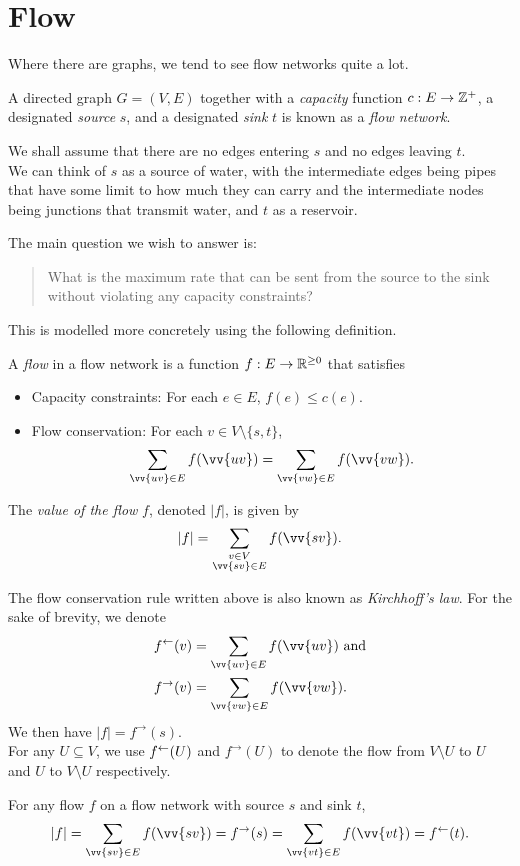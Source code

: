 \section{Flow}

Where there are graphs, we tend to see flow networks quite a lot.

\begin{fdef}
	A directed graph $G=(V,E)$ together with a \textit{capacity} function $c:E\to\mathbb{Z}^+$, a designated \textit{source} $s$, and a designated \textit{sink} $t$ is known as a \textit{flow network}.
\end{fdef}

We shall assume that there are no edges entering $s$ and no edges leaving $t$.\\
We can think of $s$ as a source of water, with the intermediate edges being pipes that have some limit to how much they can carry and the intermediate nodes being junctions that transmit water, and $t$ as a reservoir.

The main question we wish to answer is:
\begin{quote}
	What is the maximum rate that can be sent from the source to the sink without violating any capacity constraints?
\end{quote}

This is modelled more concretely using the following definition.

\begin{fdef}[Flow]
	A \textit{flow} in a flow network is a function $f:E\to\mathbb{R}^{\geq 0}$ that satisfies
	\begin{itemize}
		\item Capacity constraints: For each $e\in E$, $f(e)\leq c(e)$.
		\item Flow conservation: For each $v\in V\setminus\{s,t\}$,
		\[ \sum_{\vv{uv}\in E} f(\vv{uv}) = \sum_{\vv{vw}\in E} f(\vv{vw}). \]
	\end{itemize}
	The \textit{value of the flow} $f$, denoted $|f|$, is given by
	\[ |f| = \sum_{\substack{v\in V \\ \vv{sv}\in E}} f(\vv{sv}). \]
\end{fdef}

The flow conservation rule written above is also known as \textit{Kirchhoff's law}. For the sake of brevity, we denote
\begin{align*}
	f^{\ot}(v) &= \sum_{\vv{uv}\in E} f(\vv{uv}) \text{ and} \\
	f^{\to}(v) &= \sum_{\vv{vw}\in E} f(\vv{vw}).
\end{align*}
We then have $|f|=f^{\to}(s)$.\\
For any $U\subseteq V$, we use $f^{\leftarrow}(U)$ and $f^{\to}(U)$ to denote the flow from $V\setminus U$ to $U$ and $U$ to $V\setminus U$ respectively.

\begin{lemma}
	For any flow $f$ on a flow network with source $s$ and sink $t$,
	\[ |f| = \sum_{\vv{sv}\in E}f(\vv{sv}) = f^{\to}(s) = \sum_{\vv{vt}\in E}f(\vv{vt}) = f^{\ot}(t). \]
\end{lemma}